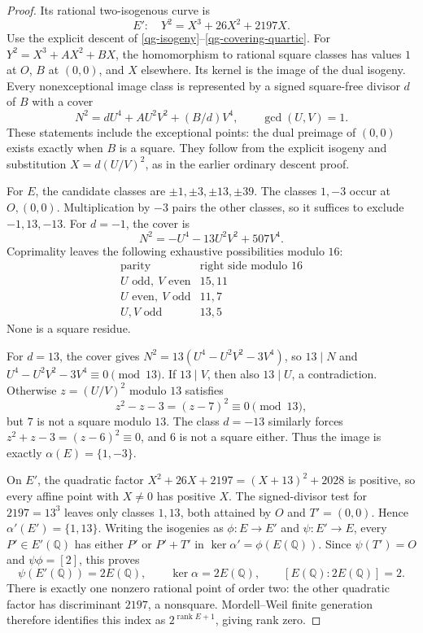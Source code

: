 \begin{proof}
Its rational two-isogenous curve is
\[
 E':\quad Y^2=X^3+26X^2+2197X.
\]
Use the explicit descent of \eqref{qg-isogeny}--\eqref{qg-covering-quartic}.
For $Y^2=X^3+AX^2+BX$, the homomorphism to rational square classes
has values $1$ at $O$, $B$ at $(0,0)$, and $X$ elsewhere.
Its kernel is the image of the dual isogeny. Every nonexceptional
image class is represented by a signed square-free divisor $d$ of $B$
with a cover
\begin{equation}\label{q13-cover}
 N^2=dU^4+AU^2V^2+(B/d)V^4,\qquad \gcd(U,V)=1.
\end{equation}
These statements include the exceptional points: the dual preimage of
$(0,0)$ exists exactly when $B$ is a square. They follow from the
explicit isogeny and substitution $X=d(U/V)^2$, as in the earlier
ordinary descent proof.

For $E$, the candidate classes are $\pm1,\pm3,\pm13,\pm39$.
The classes $1,-3$ occur at $O,(0,0)$. Multiplication by $-3$ pairs
the other classes, so it suffices to exclude $-1,13,-13$.
For $d=-1$, the cover is
\[
 N^2=-U^4-13U^2V^2+507V^4.
\]
Coprimality leaves the following exhaustive possibilities modulo $16$:
\[
\begin{array}{c|c}
 \text{parity}&\text{right side modulo }16\\\hline
 U\text{ odd},\ V\text{ even}&15,11\\
 U\text{ even},\ V\text{ odd}&11,7\\
 U,V\text{ odd}&13,5
\end{array}
\]
None is a square residue.

For $d=13$, the cover gives
$N^2=13(U^4-U^2V^2-3V^4)$, so $13\mid N$ and
$U^4-U^2V^2-3V^4\equiv0\pmod{13}$. If $13\mid V$, then also
$13\mid U$, a contradiction. Otherwise $z=(U/V)^2$ modulo $13$
satisfies
\[
 z^2-z-3=(z-7)^2\equiv0\pmod{13},
\]
but $7$ is not a square modulo $13$. The class $d=-13$ similarly
forces $z^2+z-3=(z-6)^2\equiv0$, and $6$ is not a square either.
Thus the image is exactly $\alpha(E)=\{1,-3\}$.

On $E'$, the quadratic factor
$X^2+26X+2197=(X+13)^2+2028$ is positive, so every affine
point with $X\ne0$ has positive $X$. The signed-divisor test for $2197=13^3$
leaves only classes $1,13$, both attained by $O$ and
$T'=(0,0)$. Hence $\alpha'(E')=\{1,13\}$.
Writing the isogenies as $\phi:E\to E'$ and $\psi:E'\to E$,
every $P'\in E'(\mathbb Q)$ has either $P'$ or $P'+T'$ in
$\ker\alpha'=\phi(E(\mathbb Q))$. Since $\psi(T')=O$ and
$\psi\phi=[2]$, this proves
\[
 \psi(E'(\mathbb Q))=2E(\mathbb Q),\qquad
 \ker\alpha=2E(\mathbb Q),\qquad
 [E(\mathbb Q):2E(\mathbb Q)]=2.
\]
There is exactly one nonzero rational point of order two: the other
quadratic factor has discriminant $2197$, a nonsquare. Mordell--Weil
finite generation therefore identifies this index as $2^{\operatorname{rank}E+1}$,
giving rank zero.


\end{proof}
